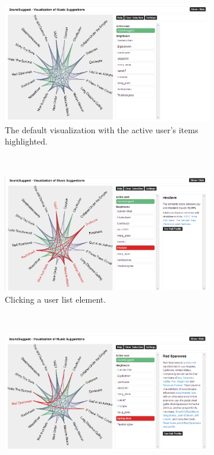 \begin{figure}
	\centering
	\begin{subfigure}[t]{0.3\textwidth}
					\centering
					\includegraphics[width=\textwidth]{img/prototype_soundsuggest2_default}
					\caption{The default visualization with the active user's items highlighted.}
					\label{figure:prototype_soundsuggest2_default}
	\end{subfigure}%
	~
	\begin{subfigure}[t]{0.3\textwidth}
					\centering
					\includegraphics[width=\textwidth]{img/prototype_soundsuggest2_user_click}
					\caption{Clicking a user list element.}
					\label{figure:prototype_soundsuggest2_user_click}
	\end{subfigure}
	~
	\begin{subfigure}[t]{0.3\textwidth}
					\centering
					\includegraphics[width=\textwidth]{img/prototype_soundsuggest2_item_click}

\end{subfigure}
\end{figure}
